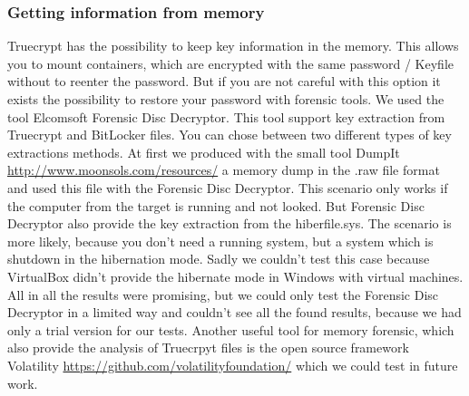\subsubsection{Getting information from memory}
Truecrypt has the possibility to keep key information in the memory. This allows you to mount containers, which are encrypted with the same password / Keyfile without to reenter the password. But if you are not careful with this option it exists the possibility to restore your password with forensic tools. We used the tool Elcomsoft Forensic Disc Decryptor.
\cite{elcomsoft:forensicDiskDecrypt} 
This tool support key extraction from Truecrypt and BitLocker files. You can chose between two different types of key extractions methods. At first we produced with the small tool DumpIt \url{http://www.moonsols.com/resources/} a memory dump in the .raw file format and used this file with the Forensic Disc Decryptor.
This scenario only works if the computer from the target is running and not looked. But Forensic Disc Decryptor also provide the key extraction from the hiberfile.sys. The scenario is more likely, because you don't need a running system, but a system which is shutdown in the hibernation mode.  Sadly we couldn't test this case because VirtualBox didn't provide the hibernate mode in Windows with virtual machines. 
All in all the results were promising, but we could only test the Forensic Disc Decryptor in a limited way and couldn't see all the found results, because we had only a trial version for our tests. Another useful tool for memory forensic, which also provide the analysis of Truecrpyt files is the open source framework Volatility  \url{https://github.com/volatilityfoundation/} which we could test in future work.

